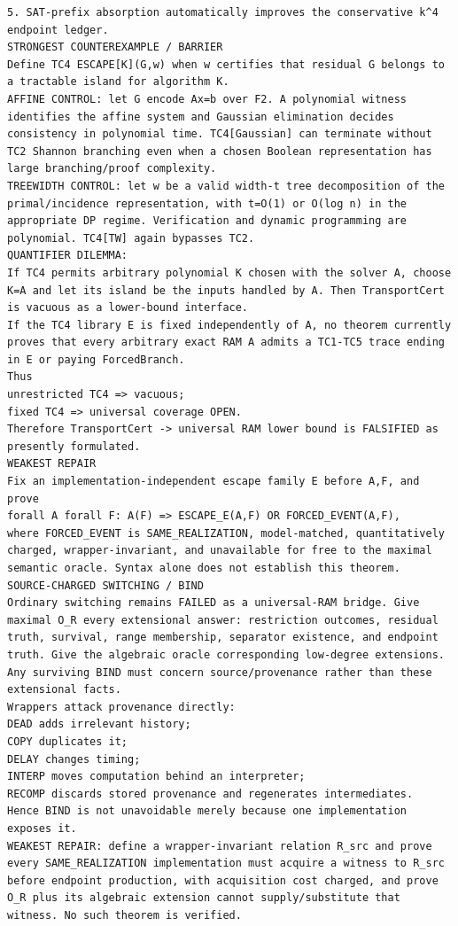 \documentclass[11pt]{article}
\begin{document}
\begin{Verbatim}[breaklines=true,breakanywhere=true]
5. SAT-prefix absorption automatically improves the conservative k^4 endpoint ledger.
STRONGEST COUNTEREXAMPLE / BARRIER
Define TC4 ESCAPE[K](G,w) when w certifies that residual G belongs to a tractable island for algorithm K.
AFFINE CONTROL: let G encode Ax=b over F2. A polynomial witness identifies the affine system and Gaussian elimination decides consistency in polynomial time. TC4[Gaussian] can terminate without TC2 Shannon branching even when a chosen Boolean representation has large branching/proof complexity.
TREEWIDTH CONTROL: let w be a valid width-t tree decomposition of the primal/incidence representation, with t=O(1) or O(log n) in the appropriate DP regime. Verification and dynamic programming are polynomial. TC4[TW] again bypasses TC2.
QUANTIFIER DILEMMA:
If TC4 permits arbitrary polynomial K chosen with the solver A, choose K=A and let its island be the inputs handled by A. Then TransportCert is vacuous as a lower-bound interface.
If the TC4 library E is fixed independently of A, no theorem currently proves that every arbitrary exact RAM A admits a TC1-TC5 trace ending in E or paying ForcedBranch.
Thus
unrestricted TC4 => vacuous;
fixed TC4 => universal coverage OPEN.
Therefore TransportCert -> universal RAM lower bound is FALSIFIED as presently formulated.
WEAKEST REPAIR
Fix an implementation-independent escape family E before A,F, and prove
forall A forall F: A(F) => ESCAPE_E(A,F) OR FORCED_EVENT(A,F),
where FORCED_EVENT is SAME_REALIZATION, model-matched, quantitatively charged, wrapper-invariant, and unavailable for free to the maximal semantic oracle. Syntax alone does not establish this theorem.
SOURCE-CHARGED SWITCHING / BIND
Ordinary switching remains FAILED as a universal-RAM bridge. Give maximal O_R every extensional answer: restriction outcomes, residual truth, survival, range membership, separator existence, and endpoint truth. Give the algebraic oracle corresponding low-degree extensions. Any surviving BIND must concern source/provenance rather than these extensional facts.
Wrappers attack provenance directly:
DEAD adds irrelevant history;
COPY duplicates it;
DELAY changes timing;
INTERP moves computation behind an interpreter;
RECOMP discards stored provenance and regenerates intermediates.
Hence BIND is not unavoidable merely because one implementation exposes it.
WEAKEST REPAIR: define a wrapper-invariant relation R_src and prove every SAME_REALIZATION implementation must acquire a witness to R_src before endpoint production, with acquisition cost charged, and prove O_R plus its algebraic extension cannot supply/substitute that witness. No such theorem is verified.

\end{Verbatim}
\end{document}

